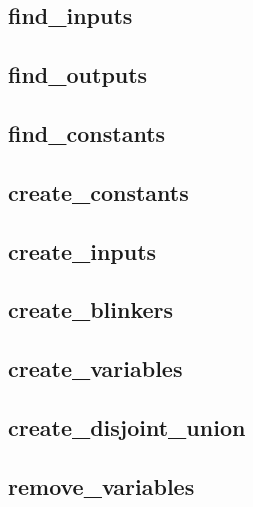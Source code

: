 \documentclass[letterpaper,10pt,english]{sphinxmanual}
\begin{document}
\subsection{find\_inputs}
\label{\detokenize{PrimeImplicants:id3}}\label{\detokenize{PrimeImplicants:find-inputs}}

\subsection{find\_outputs}
\label{\detokenize{PrimeImplicants:id4}}\label{\detokenize{PrimeImplicants:find-outputs}}

\subsection{find\_constants}
\label{\detokenize{PrimeImplicants:id5}}\label{\detokenize{PrimeImplicants:find-constants}}

\subsection{create\_constants}
\label{\detokenize{PrimeImplicants:id6}}\label{\detokenize{PrimeImplicants:create-constants}}

\subsection{create\_inputs}
\label{\detokenize{PrimeImplicants:id7}}\label{\detokenize{PrimeImplicants:create-inputs}}

\subsection{create\_blinkers}
\label{\detokenize{PrimeImplicants:create-blinkers}}\label{\detokenize{PrimeImplicants:id8}}

\subsection{create\_variables}
\label{\detokenize{PrimeImplicants:create-variables}}\label{\detokenize{PrimeImplicants:id9}}

\subsection{create\_disjoint\_union}
\label{\detokenize{PrimeImplicants:id10}}\label{\detokenize{PrimeImplicants:create-disjoint-union}}

\subsection{remove\_variables}
\label{\detokenize{PrimeImplicants:remove-variables}}\label{\detokenize{PrimeImplicants:id11}}
\end{document}
